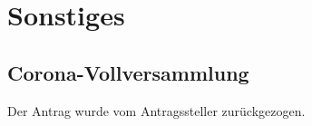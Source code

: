 \section{Sonstiges}
\subsection{Corona-Vollversammlung}
Der Antrag wurde vom Antragssteller zurückgezogen.